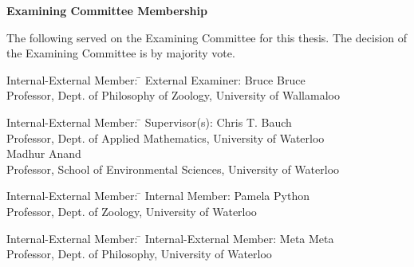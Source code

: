 \cleardoublepage %

 
\begin{center}\textbf{Examining Committee Membership}\end{center}
  \noindent
The following served on the Examining Committee for this thesis. The decision of the Examining Committee is by majority vote.
  \bigskip
  
  \noindent
\begin{tabbing}
Internal-External Member: \=  \kill %
External Examiner: \>  Bruce Bruce \\ 
\> Professor, Dept. of Philosophy of Zoology, University of Wallamaloo \\
\end{tabbing} 
  \bigskip
  
  \noindent
\begin{tabbing}
Internal-External Member: \=  \kill %
Supervisor(s): \> Chris T. Bauch \\
\> Professor, Dept. of Applied Mathematics, University of Waterloo \\
\> Madhur Anand \\
\> Professor, School of Environmental Sciences, University of Waterloo \\
\end{tabbing}
  \bigskip
  
  \noindent
  \begin{tabbing}
Internal-External Member: \=  \kill %
Internal Member: \> Pamela Python \\
\> Professor, Dept. of Zoology, University of Waterloo \\
\end{tabbing}
  \bigskip
  
  \noindent
\begin{tabbing}
Internal-External Member: \=  \kill %
Internal-External Member: \> Meta Meta \\
\> Professor, Dept. of Philosophy, University of Waterloo \\
\end{tabbing}
  \bigskip
  
